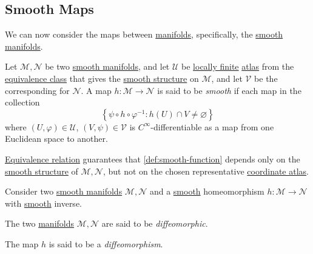 \subsection{Smooth Maps}
We can now consider the maps between \hyperref[def:topological-manifold]{manifolds}, specifically, the \hyperref[def:smooth-manifold]{smooth manifolds}.

\begin{definition}\label{def:smooth-function}
	Let \(\mathcal{M} , \mathcal{N} \) be two \hyperref[def:smooth-manifold]{smooth manifolds}, and let \(\mathcal{U}\) be \hyperref[def:locally-finite]{locally finite} \hyperref[def:atlas]{atlas} from the \hyperref[def:equivalence-atlas]{equivalence class} that gives the \hyperref[def:smooth-structure]{smooth structure} on \(\mathcal{M} \), and let \(\mathcal{V}\) be the corresponding for \(\mathcal{N} \). A map \(h\colon \mathcal{M} \to \mathcal{N} \) is said to be \emph{smooth} if each map in the collection
	\[
		\left\{ \psi \circ h\circ \varphi ^{-1} \colon h(U) \cap V \neq \varnothing \right\}
	\]
	where \((U, \varphi )\in \mathcal{U} \), \((V, \psi )\in \mathcal{V} \) is \(C^{\infty} \)-differentiable as a map from one Euclidean space to another.
\end{definition}

\begin{center}
\end{center}

\begin{remark}
	\hyperref[def:equivalence-atlas]{Equivalence relation} guarantees that \autoref{def:smooth-function} depends only on the \hyperref[def:smooth-structure]{smooth structure} of \(\mathcal{M} , \mathcal{N} \), but not on the chosen representative \hyperref[def:atlas]{coordinate atlas}.
\end{remark}

\begin{definition*}
	Consider two \hyperref[def:smooth-manifold]{smooth manifolds} \(\mathcal{M} , \mathcal{N} \) and a \hyperref[def:smooth-function]{smooth} homeomorphism \(h\colon \mathcal{M} \to \mathcal{N} \) with \hyperref[def:smooth-function]{smooth} inverse.
	\begin{definition}[Diffeomorphic]\label{def:diffeomorphic}
		The two \hyperref[def:smooth-manifold]{manifolds} \(\mathcal{M} , \mathcal{N} \) are said to be \emph{diffeomorphic}.
	\end{definition}
	\begin{definition}[Diffeomorphism]\label{def:diffeomorphism}
		The map \(h\) is said to be a \emph{diffeomorphism}.
	\end{definition}
\end{definition*}

